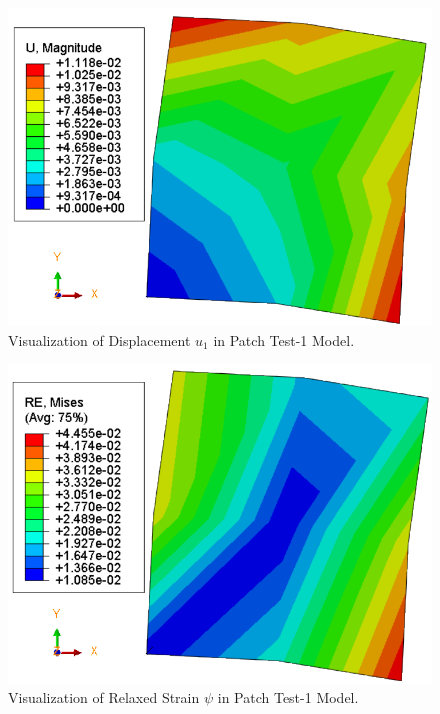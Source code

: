 \documentclass[12pt]{article}
\begin{document}
\begin{figure}[H]
	\begin{center}
		\includegraphics[scale=0.83]{patch_1_disp_crop.png} 
	\end{center}  
    \caption{Visualization of Displacement $u_1 $ in Patch Test-1 Model.}
\end{figure}
\begin{figure}[H]
	\begin{center}
		\includegraphics[scale=0.83]{patch_1_relaxed_strain_crop.png} 
	\end{center}  
    \caption{Visualization of Relaxed Strain $\psi$ in Patch Test-1 Model.}
\end{figure}
\end{document}

